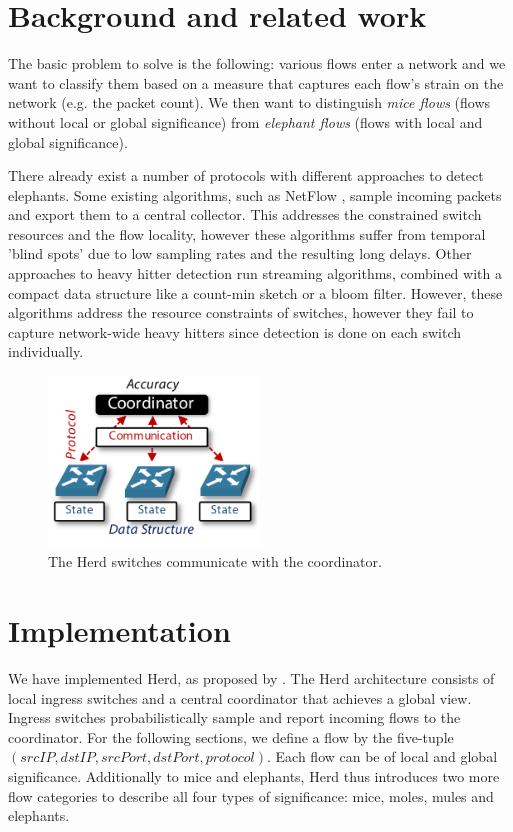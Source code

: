 \documentclass[11pt,oneside,a4paper]{article}
\begin{document}
\section{Background and related work}

The basic problem to solve is the following: various flows enter a network and we want to classify them based on a measure that captures each flow's strain on the network (e.g. the packet count). We then want to distinguish \textit{mice flows} (flows without local or global significance) from \textit{elephant flows} (flows with local and global significance). 

\noindent There already exist a number of protocols with different approaches to detect elephants. Some existing algorithms, such as NetFlow \cite{claise2004netflow}, sample incoming packets and export them to a central collector. This addresses the constrained switch resources and the flow locality, however these algorithms suffer from temporal 'blind spots' due to low sampling rates and the resulting long delays. Other approaches to heavy hitter detection run streaming algorithms, combined with a compact data structure like a count-min sketch \cite{cormode2003countmin} or a bloom filter. However, these algorithms address the resource constraints of switches, however they fail to capture network-wide heavy hitters since detection is done on each switch individually.

\begin{figure}
	\centering
	\includegraphics[width=0.5\textwidth,scale=1]{figures/global_local_paper}
	\caption{The Herd switches communicate with the coordinator. \cite{anon2019herd}}
	\label{fig:global_fig}
\end{figure}

\section{Implementation}

We have implemented Herd, as proposed by \cite{anon2019herd}. The Herd architecture consists of local ingress switches and a central coordinator that achieves a global view. Ingress switches probabilistically sample and report incoming flows to the coordinator. For the following sections, we define a flow by the five-tuple $(srcIP, dstIP, srcPort, dstPort, protocol)$. Each flow can be of local and global significance. Additionally to mice and elephants, Herd thus introduces two more flow categories to describe all four types of significance: mice, moles, mules and elephants.
\end{document}
